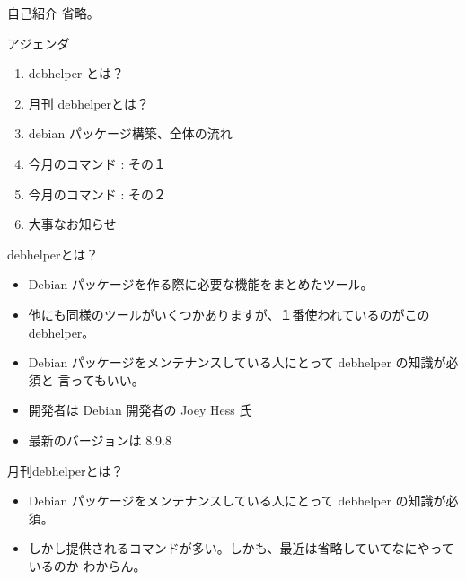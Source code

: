 \frame{\titlepage{}}


\begin{frame}{自己紹介}
省略。
\end{frame}


\begin{frame}{アジェンダ}
\begin{enumerate}
\item debhelper とは？
\item 月刊 debhelperとは？
\item debian パッケージ構築、全体の流れ
\item 今月のコマンド : その１
\item 今月のコマンド : その２
\item 大事なお知らせ
\end{enumerate}
\end{frame}

\begin{frame}{debhelperとは？}

\begin{itemize}
\item Debian パッケージを作る際に必要な機能をまとめたツール。
\item 他にも同様のツールがいくつかありますが、１番使われているのがこの debhelper。
\item Debian パッケージをメンテナンスしている人にとって debhelper の知識が必須と
言ってもいい。
\item 開発者は Debian 開発者の Joey Hess 氏
\item 最新のバージョンは 8.9.8
\end{itemize}
\end{frame}



\begin{frame}{月刊debhelperとは？}

\begin{itemize}
\item Debian パッケージをメンテナンスしている人にとって debhelper の知識が必須。
\item しかし提供されるコマンドが多い。しかも、最近は省略していてなにやっているのか
わからん。
\end{itemize}
\end{frame}


